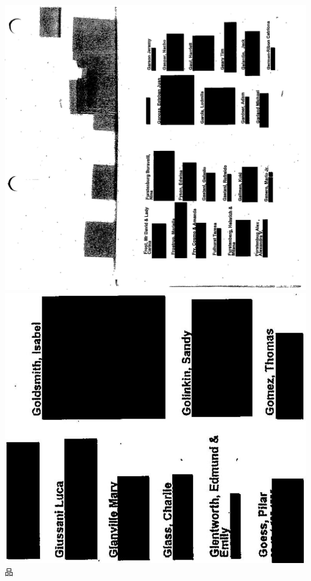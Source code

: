 \documentclass[10pt]{article}
\begin{document}
\includegraphics[max width=\textwidth, center]{2025_02_27_dd68c3d38de88f0516d9g-143}\\
\includegraphics[max width=\textwidth, center]{2025_02_27_dd68c3d38de88f0516d9g-144(2)}\\
品\\
\end{document}
